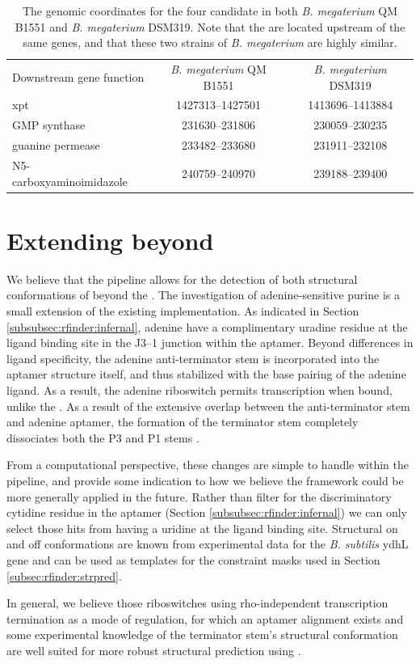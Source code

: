 \begin{table}[!ht]
\centering
\begin{tabularx}{\linewidth}{*{1}{L} *{2}{C}}
  \toprule
  \small{Downstream gene function} & \small{{\em B. megaterium} QM B1551} & \small{{\em B. megaterium} DSM319} \\
  \cmidrule(lr){1-3}
  \small{xpt} & 1427313--1427501 & 1413696--1413884 \\[1ex]
  \small{GMP synthase} & 231630--231806 & 230059--230235 \\[1ex]
  \small{guanine permease} & 233482--233680 & 231911--232108 \\[1ex]
  \small{N5-carboxyaminoimidazole} & 240759--240970 & 239188--239400 \\
  \bottomrule
\end{tabularx}
\caption{The genomic coordinates for the four candidate \grbs in both
{\em B. megaterium} QM B1551 and {\em B. megaterium} DSM319. Note that the
\grbs are located upstream of the same genes, and that these two strains of
{\em B. megaterium} are highly similar.}
\label{table:rfinderCandidateLocs}
\end{table}

\section{Extending beyond \grbs}
\label{sec:rfinder:ext}

We believe that the \rfinder pipeline allows for the detection of both structural
conformations of \rbs beyond the \grb. The investigation of
adenine-sensitive purine \rbs is a small extension of the existing
implementation. As indicated in Section \ref{subsubsec:rfinder:infernal}, adenine
\rbs have a complimentary uradine residue at the ligand binding site in
the J3--1 junction within the aptamer. Beyond differences in ligand specificity,
the adenine \rb anti-terminator stem is incorporated into the aptamer structure
itself, and thus stabilized with the base pairing of the adenine ligand. As a
result, the adenine riboswitch permits transcription when bound, unlike the \grb.
As a result of the extensive overlap between the anti-terminator stem and adenine
\rb aptamer, the formation of the terminator stem completely dissociates both the
P3 and P1 stems \citep{mandal2004a}.

From a computational perspective, these changes are simple to handle within the
\rfinder pipeline, and provide some indication to how we believe the framework
could be more generally applied in the future. Rather than filter for the
discriminatory cytidine residue in the \rb aptamer (Section \ref{subsubsec:rfinder:infernal}) we can only select those hits from \infernal having a uridine at the
ligand binding site. Structural on and off conformations are known from
experimental data for the {\em B. subtilis} ydhL gene \citep{mandal2004a} and can
be used as templates for the constraint masks used in Section \ref{subsec:rfinder:strpred}.

In general, we believe those riboswitches using rho-independent transcription
termination as a mode of regulation, for which an aptamer alignment exists and
some experimental knowledge of the terminator stem's structural conformation are
well suited for more robust structural prediction using \rfinder.
